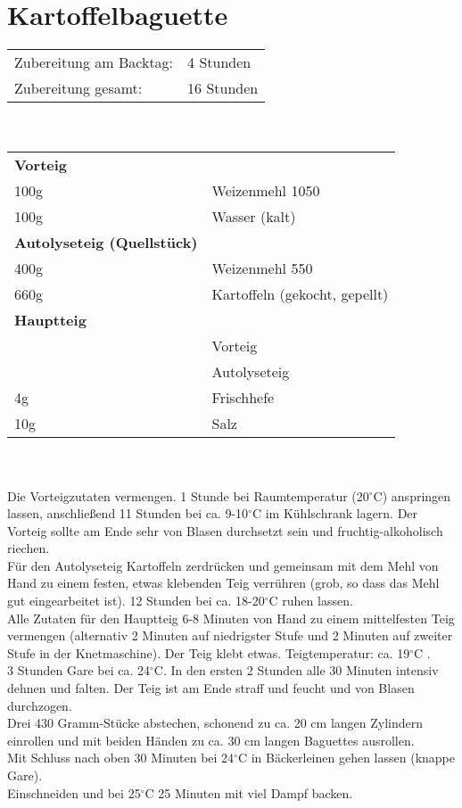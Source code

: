 \section{Kartoffelbaguette}
\begin{tabular}{ll}
    Zubereitung am Backtag: & 4 Stunden  \\
    Zubereitung gesamt:     & 16 Stunden
\end{tabular}\\\paragraph*{}
\begin{tabular}{ll}
    \textbf{Vorteig} \\
    100g & Weizenmehl 1050               \\
    100g & Wasser (kalt)                 \\
    \textbf{Autolyseteig (Quellstück)} \\
    400g & Weizenmehl 550                \\
    660g & Kartoffeln (gekocht, gepellt) \\
    \textbf{Hauptteig} \\
    & Vorteig                       \\
    & Autolyseteig                  \\
    4g   & Frischhefe                    \\
    10g  & Salz                          \\
\end{tabular}\\\paragraph*{}
Die Vorteigzutaten vermengen. 1 Stunde bei Raumtemperatur (20$^\circ$C) anspringen lassen, anschließend 11 Stunden bei ca. 9-10$^\circ$C im Kühlschrank lagern. Der Vorteig sollte am Ende sehr von Blasen durchsetzt sein und fruchtig-alkoholisch riechen.\\
Für den Autolyseteig Kartoffeln zerdrücken und gemeinsam mit dem Mehl von Hand zu einem festen, etwas klebenden Teig verrühren (grob, so dass das Mehl gut eingearbeitet ist). 12 Stunden bei ca. 18-20$^\circ$C ruhen lassen.\\
Alle Zutaten für den Hauptteig 6-8 Minuten von Hand zu einem mittelfesten Teig vermengen (alternativ 2 Minuten auf niedrigster Stufe und 2 Minuten auf zweiter Stufe in der Knetmaschine). Der Teig klebt etwas. Teigtemperatur: ca. 19$^\circ$C .\\
3 Stunden Gare bei ca. 24$^\circ$C. In den ersten 2 Stunden alle 30 Minuten intensiv dehnen und falten. Der Teig ist am Ende straff und feucht und von Blasen durchzogen.\\
Drei 430 Gramm-Stücke abstechen, schonend zu ca. 20 cm langen Zylindern einrollen und mit beiden Händen zu ca. 30 cm langen Baguettes ausrollen.\\
Mit Schluss nach oben 30 Minuten bei 24$^\circ$C in Bäckerleinen gehen lassen (knappe Gare).\\
Einschneiden und bei 25$^\circ$C 25 Minuten mit viel Dampf backen.
\newpage


